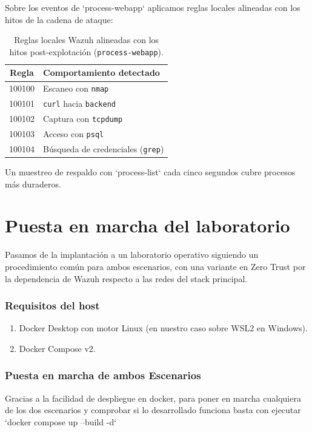 \documentclass[11pt,spanish,listoffigures,listoftables]{tfgetsinf}
\begin{document}
        Sobre los eventos de `process-webapp` aplicamos reglas locales alineadas con los hitos de la cadena de ataque:

        \begin{table}[H]
          \centering
          \begin{tabular}{|c|p{9.5cm}|}
            \hline
            \textbf{Regla} & \textbf{Comportamiento detectado} \\
            \hline
            100100 & Escaneo con \texttt{nmap} \\
            \hline
            100101 & \texttt{curl} hacia \texttt{backend} \\
            \hline
            100102 & Captura con \texttt{tcpdump} \\
            \hline
            100103 & Acceso con \texttt{psql} \\
            \hline
            100104 & Búsqueda de credenciales (\texttt{grep}) \\
            \hline
          \end{tabular}
          \caption{Reglas locales Wazuh alineadas con los hitos post-explotación (\texttt{process-webapp}).}
          \label{tab:wazuh-reglas}
        \end{table}

        Un muestreo de respaldo con `process-list` cada cinco segundos cubre procesos más duraderos.

    \section{Puesta en marcha del laboratorio}
    \label{sec:5.4}
    
    Pasamos de la implantación a un laboratorio operativo siguiendo un procedimiento común para ambos escenarios, con una variante en Zero Trust por la dependencia de Wazuh respecto a las redes del stack principal.
    
    \subsubsection{Requisitos del host}
    \begin{enumerate}
        \item Docker Desktop con motor Linux (en nuestro caso sobre WSL2 en Windows).
        \item Docker Compose v2.
    \end{enumerate}
    
    \subsubsection{Puesta en marcha de ambos Escenarios}
    Gracias a la facilidad de despliegue en docker, para poner en marcha cualquiera de los dos escenarios y comprobar si lo desarrollado funciona basta con ejecutar `docker compose up --build -d`
\end{document}
